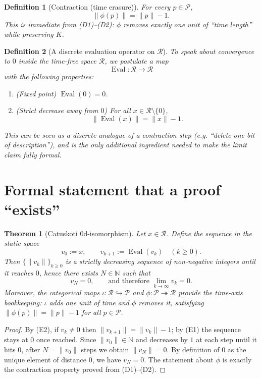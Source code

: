 \documentclass[12pt,a4paper]{article}
\newcommand{\dfix}{\mathfrak{0}}          %
\newcommand{\Rep}{\mathcal{R}}           %
\newcommand{\Prf}{\mathcal{P}}           %
\newtheorem{definition}{Definition}[section]
\newtheorem{theorem}{Theorem}[section]
\begin{document}
\begin{definition}[Contraction (time erasure)]
For every $p\in\Prf$,
\[
  \|\phi(p)\| = \|p\|-1.
\]
This is immediate from (D1)--(D2): $\phi$ removes exactly one unit of
``time length'' while preserving $K$.
\end{definition}

\begin{definition}[A discrete evaluation operator on $\Rep$]
To speak about convergence to $\dfix$ inside the time‑free space $\Rep$, we
postulate a map
\[
  \operatorname{Eval}:\Rep\to\Rep
\]
with the following properties:
\begin{enumerate}[label=(E\arabic*)]
  \item (Fixed point) $\operatorname{Eval}(\dfix)=\dfix$.
  \item (Strict decrease away from $\dfix$) For all $x\in\Rep\setminus\{\dfix\}$,
        \[
          \|\operatorname{Eval}(x)\| = \|x\|-1.
        \]
\end{enumerate}
This can be seen as a discrete analogue of a contraction step (e.g.
``delete one bit of description''), and is the only additional ingredient
needed to make the limit claim fully formal.
\end{definition}

\section{Formal statement that a proof ``exists''}

\begin{theorem}[Catuskoti $0$d$‑$isomorphism]\label{thm:c4-dfix}
Let $x\in\Rep$. Define the sequence in the static space
\[
  v_0:=x,\qquad v_{k+1}:=\operatorname{Eval}(v_k)\quad(k\ge 0).
\]
Then $\{\|v_k\|\}_{k\ge0}$ is a strictly decreasing sequence of non‑negative
integers until it reaches $0$, hence there exists $N\in\mathbb{N}$ such that
\[
  v_N=\dfix,\qquad\text{and therefore }\lim_{k\to\infty}v_k=\dfix.
\]
Moreover, the categorical maps $\iota:\Rep\hookrightarrow\Prf$ and
$\phi:\Prf\twoheadrightarrow\Rep$ provide the time‑axis bookkeeping:
$\iota$ adds one unit of time and $\phi$ removes it, satisfying
$\|\phi(p)\|=\|p\|-1$ for all $p\in\Prf$.
\end{theorem}
\begin{proof}
By (E2), if $v_k\neq\dfix$ then $\|v_{k+1}\|=\|v_k\|-1$; by (E1) the sequence
stays at $\dfix$ once reached.
Since $\|v_0\|\in\mathbb{N}$ and decreases by $1$ at each step until it hits
$0$, after $N=\|v_0\|$ steps we obtain $\|v_N\|=0$.
By definition of $\dfix$ as the unique element of distance $0$, we have
$v_N=\dfix$.
The statement about $\phi$ is exactly the contraction property proved from
(D1)--(D2).
\end{proof}
\end{document}
